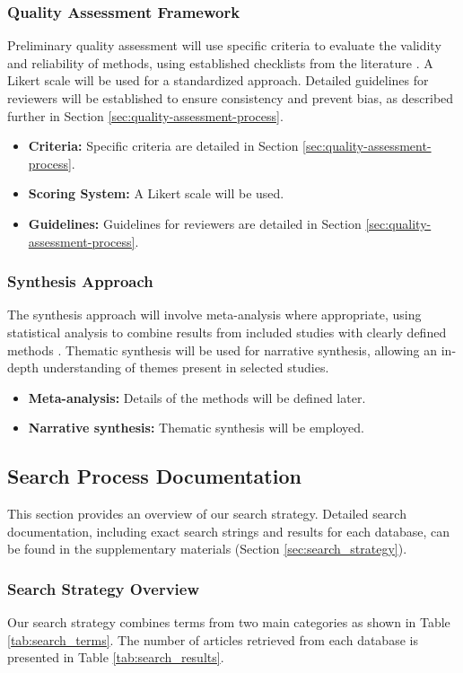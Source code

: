 \subsubsection{Quality Assessment Framework}
Preliminary quality assessment will use specific criteria to evaluate the validity and reliability
of methods, using established checklists from the literature \cite{ben-nun_demystifying_2020}. A
Likert scale will be used for a standardized approach. Detailed guidelines for reviewers will be
established to ensure consistency and prevent bias, as described further in Section
\ref{sec:quality-assessment-process}.
\begin{itemize}
	\item \textbf{Criteria:} Specific criteria are detailed in Section \ref{sec:quality-assessment-process}.
	\item \textbf{Scoring System:} A Likert scale will be used.
	\item \textbf{Guidelines:} Guidelines for reviewers are detailed in Section \ref{sec:quality-assessment-process}.
\end{itemize}

\subsubsection{Synthesis Approach}
The synthesis approach will involve meta-analysis where appropriate, using statistical analysis to
combine results from included studies with clearly defined methods
\cite{ben-nun_demystifying_2020}. Thematic synthesis will be used for narrative synthesis, allowing
an in-depth understanding of themes present in selected studies.
\begin{itemize}
	\item \textbf{Meta-analysis:} Details of the methods will be defined later.
	\item \textbf{Narrative synthesis:} Thematic synthesis will be employed.
\end{itemize}

\subsection{Search Process Documentation}
\label{sec:search_process_documentation}
This section provides an overview of our search strategy. Detailed search documentation, including exact search strings and results for each database, can be found in the supplementary materials (Section \ref{sec:search_strategy}).

\subsubsection{Search Strategy Overview}
Our search strategy combines terms from two main categories as shown in Table
\ref{tab:search_terms}. The number of articles retrieved from each database is presented in Table
\ref{tab:search_results}.

